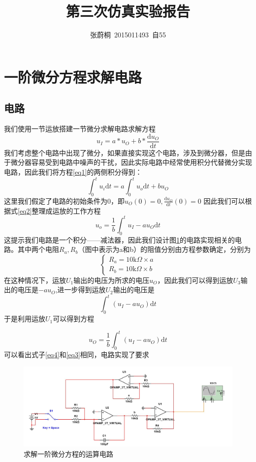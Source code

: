 \documentclass[UTF8,a4paper]{paper}
\title{第三次仿真实验报告}
\author{张蔚桐\ 2015011493\ 自55}
\begin{document}
\newcommand{\tabincell}[2]{\begin{tabular}{@{}#1@{}}#2\end{tabular}}
\maketitle
\tableofcontents
\clearpage
\section{一阶微分方程求解电路}
\subsection{电路 }
我们使用一节运放搭建一节微分求解电路求解方程
\begin{equation}
u_I=a * u_O+b*\frac{\mathrm{d}u_O}{\mathrm{d}t}
\label{eq1}
\end{equation}
我们考虑整个电路中出现了微分，如果直接实现这个电路，涉及到微分器，但是由于微分器容易受到电路中噪声的干扰，因此实际电路中经常使用积分代替微分实现电路，因此我们将方程\ref{eq1}的两侧积分得到：
\begin{equation}
\int_0^tu_i\mathrm{d}t =a\int_0^tu_o\mathrm{d}t + b u_O
\label{eq2}
\end{equation}
这里我们假定了电路的初始条件为0，即$u_O(0)=0,\displaystyle{\frac{\mathrm{d}u_O}{\mathrm{d}t}(0)=0}$ 
因此我们可以根据式\ref{eq2}整理成运放的工作方程
\begin{equation}
u_o=\frac{1}{b}\int_0^tu_I-au_O\mathrm{d}t
\label{eq3}
\end{equation}
这提示我们电路是一个积分——减法器，因此我们设计图\ref{cir1}的电路实现相关的电路。其中两个电阻$R_a,R_b$（图中表示为a和b）的阻值分别由方程参数确定，分别为
$$\begin{cases}
R_a= 10\mathrm{k}\Omega \times a\\
R_b=10\mathrm{k}\Omega \times b
\end{cases}$$
在这种情况下，运放$U_1$输出的电压为所求的电压$u_O$，因此我们可以得到运放$U_3$输出的电压是$-au_O$,进一步得到运放$U_2$输出的电压是
$$\int_0^t(u_I-au_O)\mathrm{d}t$$
于是利用运放$U_1$可以得到方程

\begin{equation}
u_O=\frac{1}{b}\int_0^t(u_I-au_O)\mathrm{d}t
\label{eq4}
\end{equation}
可以看出式子\ref{eq4}和\ref{eq3}相同，电路实现了要求
\begin{figure}
\centering
\includegraphics[width=\textwidth]{cir1.jpg}
\caption{求解一阶微分方程的运算电路}
\label{cir1}
\end{figure}
\end{document}

